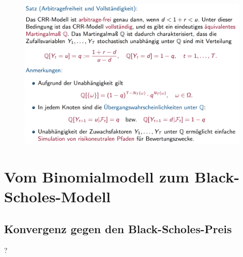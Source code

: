 \documentclass[12pt]{report}
\theoremstyle{dotless}
\theoremstyle{definition}
\begin{document}
\begin{figure}[H]
\centering
\includegraphics[width=\textwidth]{Bilder/SatzArbitragefreiheit.png}
\end{figure}

\section{Vom Binomialmodell zum Black-Scholes-Modell}

\subsection{Konvergenz gegen den Black-Scholes-Preis}

?
\end{document}
